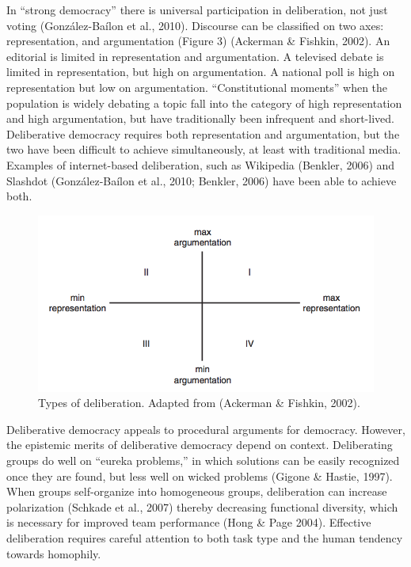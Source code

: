 In “strong democracy” there is universal participation in deliberation, not just voting (Gonz\'alez-Ba\'ilon et al., 2010). Discourse can be classified on two axes: representation, and argumentation (Figure 3) (Ackerman \& Fishkin, 2002). An editorial is limited in representation and argumentation. A televised debate is limited in representation, but high on argumentation. A national poll is high on representation but low on argumentation. “Constitutional moments” when the population is widely debating a topic fall into the category of high representation and high argumentation, but have traditionally been infrequent and short-lived. Deliberative democracy requires both representation and argumentation, but the two have been difficult to achieve simultaneously, at least with traditional media. Examples of internet-based deliberation, such as Wikipedia (Benkler, 2006) and Slashdot (Gonz\'alez-Ba\'ilon et al., 2010; Benkler, 2006) have been able to achieve both.

\begin{figure}
\includegraphics{images/fig-deliberation.png}
\caption{Types of deliberation. Adapted from (Ackerman \& Fishkin, 2002).\label{fig:deliberation}}
\end{figure}

Deliberative democracy appeals to procedural arguments for democracy. However, the epistemic merits of deliberative democracy depend on context. Deliberating groups do well on “eureka problems,” in which solutions can be easily recognized once they are found, but less well on wicked problems (Gigone \& Hastie, 1997). When groups self-organize into homogeneous groups, deliberation can increase polarization (Schkade et al., 2007) thereby decreasing functional diversity, which is necessary for improved team performance (Hong \& Page 2004). Effective deliberation requires careful attention to both task type and the human tendency towards homophily.

